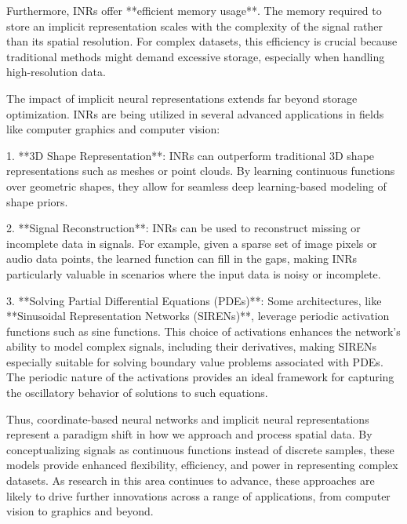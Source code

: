 Furthermore, INRs offer **efficient memory usage**. The memory required to store an implicit representation scales with the complexity of the signal rather than its spatial resolution. For complex datasets, this efficiency is crucial because traditional methods might demand excessive storage, especially when handling high-resolution data.

The impact of implicit neural representations extends far beyond storage optimization. INRs are being utilized in several advanced applications in fields like computer graphics and computer vision:

1. **3D Shape Representation**: INRs can outperform traditional 3D shape representations such as meshes or point clouds. By learning continuous functions over geometric shapes, they allow for seamless deep learning-based modeling of shape priors.

2. **Signal Reconstruction**: INRs can be used to reconstruct missing or incomplete data in signals. For example, given a sparse set of image pixels or audio data points, the learned function can fill in the gaps, making INRs particularly valuable in scenarios where the input data is noisy or incomplete.

3. **Solving Partial Differential Equations (PDEs)**: Some architectures, like **Sinusoidal Representation Networks (SIRENs)**, leverage periodic activation functions such as sine functions. This choice of activations enhances the network’s ability to model complex signals, including their derivatives, making SIRENs especially suitable for solving boundary value problems associated with PDEs. The periodic nature of the activations provides an ideal framework for capturing the oscillatory behavior of solutions to such equations.

Thus, coordinate-based neural networks and implicit neural representations represent a paradigm shift in how we approach and process spatial data. By conceptualizing signals as continuous functions instead of discrete samples, these models provide enhanced flexibility, efficiency, and power in representing complex datasets. As research in this area continues to advance, these approaches are likely to drive further innovations across a range of applications, from computer vision to graphics and beyond.




